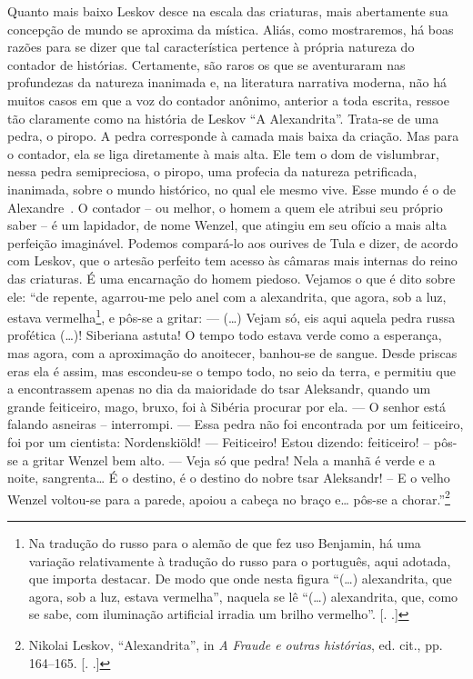 Quanto mais baixo Leskov desce na escala das criaturas, mais abertamente
sua concepção de mundo se aproxima da mística. Aliás, como mostraremos,
há boas razões para se dizer que tal característica pertence à própria
natureza do contador de histórias. Certamente, são raros os que se
aventuraram nas profundezas da natureza inanimada e, na literatura
narrativa moderna, não há muitos casos em que a voz do contador anônimo,
anterior a toda escrita, ressoe tão claramente como na história de
Leskov ``A Alexandrita''. Trata-se de uma pedra, o piropo. A pedra
corresponde à camada mais baixa da criação. Mas para o contador, ela se
liga diretamente à mais alta. Ele tem o dom de vislumbrar, nessa pedra
semipreciosa, o piropo, uma profecia da natureza petrificada, inanimada,
sobre o mundo histórico, no qual ele mesmo vive. Esse mundo é o de
Alexandre~. O contador -- ou melhor, o homem a quem ele atribui seu
próprio saber -- é um lapidador, de nome Wenzel, que atingiu em seu
ofício a mais alta perfeição imaginável. Podemos compará-lo aos ourives
de Tula e dizer, de acordo com Leskov, que o artesão perfeito tem acesso
às câmaras mais internas do reino das criaturas. É uma encarnação do
homem piedoso. Vejamos o que é dito sobre ele: ``de repente, agarrou-me
pelo anel com a alexandrita, que agora, sob a luz, estava
vermelha\footnote{Na tradução do russo para o alemão de que fez uso
  Benjamin, há uma variação relativamente à tradução do russo para o
  português, aqui adotada, que importa destacar. De modo que onde nesta
  figura ``(\ldots{}) alexandrita, que agora, sob a luz, estava
  vermelha'', naquela se lê ``(\ldots{}) alexandrita, que, como se sabe,
  com iluminação artificial irradia um brilho vermelho''. [. .]}, e pôs-se a gritar: --- (\ldots{}) Vejam só, eis aqui aquela pedra
russa profética (\ldots{})! Siberiana astuta! O tempo todo estava verde como
a esperança, mas agora, com a aproximação do anoitecer, banhou-se de
sangue. Desde priscas eras ela é assim, mas escondeu-se o tempo todo, no
seio da terra, e permitiu que a encontrassem apenas no dia da maioridade
do tsar Aleksandr, quando um grande feiticeiro, mago, bruxo, foi à
Sibéria procurar por ela. --- O senhor está falando asneiras --
interrompi. --- Essa pedra não foi encontrada por um feiticeiro, foi por
um cientista: Nordenskiöld! --- Feiticeiro! Estou dizendo: feiticeiro! --
pôs-se a gritar Wenzel bem alto. --- Veja só que pedra! Nela a manhã é
verde e a noite, sangrenta\ldots{} É o destino, é o destino do nobre tsar
Aleksandr! -- E o velho Wenzel voltou-se para a parede, apoiou a cabeça no
braço e\ldots{} pôs-se a chorar.''\footnote{Nikolai Leskov, ``Alexandrita'',
  in \emph{A Fraude e outras histórias}, ed. cit., pp. 164--165. [. .]}

